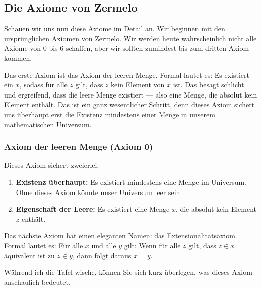 \subsection{Die Axiome von Zermelo}

\begin{spoken-clean}[01:18:40 - 01:20:18]
Schauen wir uns nun diese Axiome im Detail an. Wir beginnen mit den ursprünglichen Axiomen von Zermelo. Wir werden heute wahrscheinlich nicht alle Axiome von 0 bis 6 schaffen, aber wir sollten zumindest bis zum dritten Axiom kommen.

Das erste Axiom ist das Axiom der leeren Menge. Formal lautet es: Es existiert ein $x$, sodass für alle $z$ gilt, dass $z$ kein Element von $x$ ist. Das besagt schlicht und ergreifend, dass die leere Menge existiert --- also eine Menge, die absolut kein Element enthält. Das ist ein ganz wesentlicher Schritt, denn dieses Axiom sichert uns überhaupt erst die Existenz mindestens einer Menge in unserem mathematischen Universum.
\end{spoken-clean}

\subsubsection{Axiom der leeren Menge (Axiom 0)}
\begin{math-stroke}

\begin{explanation-of-steps}
Dieses Axiom sichert zweierlei:
\begin{enumerate}[label=\textbf{\arabic*.}]
    \item \textbf{Existenz überhaupt:} Es existiert mindestens eine Menge im Universum. Ohne dieses Axiom könnte unser Universum leer sein.
    \item \textbf{Eigenschaft der Leere:} Es existiert eine Menge $x$, die absolut kein Element $z$ enthält.
\end{enumerate}
\end{explanation-of-steps}
\end{math-stroke}

\begin{spoken-clean}[01:20:18 - 01:22:20]
Das nächste Axiom hat einen eleganten Namen: das Extensionalitätsaxiom. Formal lautet es: Für alle $x$ und alle $y$ gilt: Wenn für alle $z$ gilt, dass $z \in x$ äquivalent ist zu $z \in y$, dann folgt daraus $x = y$.

Während ich die Tafel wische, können Sie sich kurz überlegen, was dieses Axiom anschaulich bedeutet.
\end{spoken-clean}

